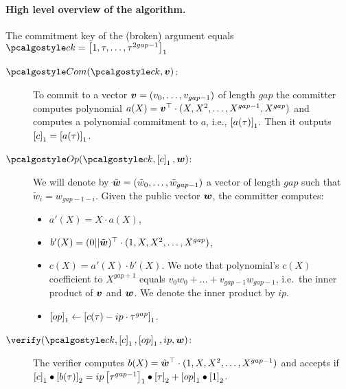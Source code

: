 \documentclass[runningheads,11pt,a4paper]{llncs}
\let\vec\accentvec
\let\vec\spvec
\def\vec#1{\mathchoice{\mbox{\boldmath$\displaystyle#1$}}
  {\mbox{\boldmath$\textstyle#1$}} {\mbox{\boldmath$\scriptstyle#1$}}
  {\mbox{\boldmath$\scriptscriptstyle#1$}}}
\begin{document}
\paragraph{High level overview of the algorithm.}
The commitment key of the (broken) argument equals $\ck = \gone{1, \tau, \ldots, \tau^{2 gap - 1}}$
\begin{description}
    \item[$\com (\ck, \vec{v})$:] To commit to a vector $\vec{v} = (v_0, \ldots, v_{gap - 1})$ of length $gap$ the committer computes polynomial $a(X) = \vec{v}^\top \cdot (X, X^2, \ldots, X^{gap - 1}, X^{gap})$ and computes a polynomial commitment to $a$, i.e., $\left[a (\tau)\right]_{1}$. Then it outputs $\left[c\right]_{1} = \left[a (\tau)\right]_{1}$.
    \item[$\open (\ck, \gone{c}, \vec{w})$:] We will denote by $\tilde{\vec{w}} = (\tilde{w}_0, \ldots, \tilde{w}_{gap - 1})$ a vector of length $gap$ such that $\tilde{w}_i = w_{gap - 1 - i}$. Given the public vector $\vec{w}$, the committer computes: 
    \begin{itemize}
        \item $a' (X) = X \cdot a (X)$,
        \item $b'(X) = (0 || \tilde{\vec{w}})^\top \cdot (1, X, X^2, \ldots, X^{gap})$,
        \item $c (X) = a' (X) \cdot b'(X)$. We note that polynomial's $c (X)$ coefficient to $X^{gap + 1}$ equals $v_0 w_0 + \ldots + v_{gap - 1} w_{gap - 1}$, i.e.~the inner product of $\vec{v}$ and $\vec{w}$. We denote the inner product by $ip$.
        \item $\left[op\right]_{1} \gets \left[c(\tau) - ip \cdot \tau^{gap}\right]_{1}$.
    \end{itemize}
    
    \item[$\verify (\ck, \gone{c}, \gone{op}, ip, \vec{w})$:] The verifier computes $b (X) = \tilde{\vec{w}}^\top \cdot (1, X, X^2, \ldots, X^{gap - 1})$ and accepts if $\left[c\right]_{1} \bullet \left[b(\tau)\right]_{2} = ip \left[\tau^{gap - 1}\right]_{1} \bullet \left[\tau\right]_{2} + \left[op\right]_{1} \bullet \left[1\right]_{2}$.
\end{description}
\end{document}
